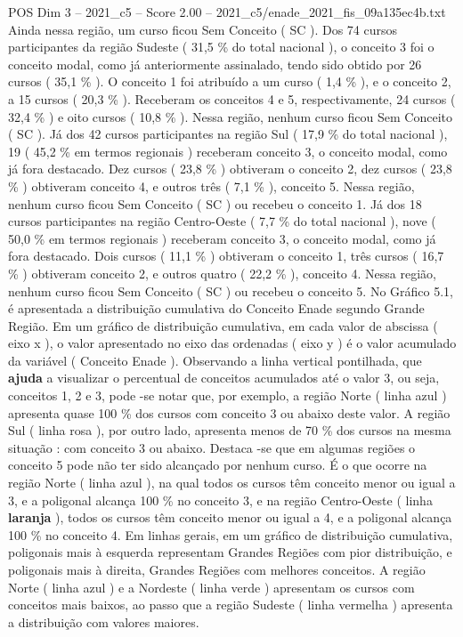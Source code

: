 \begin{textsample}{POS Dim 3 – 2021\_c5 – Score 2.00 – 2021\_c5/enade\_2021\_fis\_09a135ec4b.txt}
Ainda nessa região, um curso ficou Sem Conceito ( SC ).
Dos 74 cursos participantes da região Sudeste ( 31,5 \% do total nacional ), o conceito 3 foi o conceito modal, como já anteriormente assinalado, tendo sido obtido por 26 cursos ( 35,1 \% ).
O conceito 1 foi atribuído a um curso ( 1,4 \% ), e o conceito 2, a 15 cursos ( 20,3 \% ).
Receberam os conceitos 4 e 5, respectivamente, 24 cursos ( 32,4 \% ) e oito cursos ( 10,8 \% ).
Nessa região, nenhum curso ficou Sem Conceito ( SC ).
Já dos 42 cursos participantes na região Sul ( 17,9 \% do total nacional ), 19 ( 45,2 \% em termos regionais ) receberam conceito 3, o conceito modal, como já fora destacado.
Dez cursos ( 23,8 \% ) obtiveram o conceito 2, dez cursos ( 23,8 \% ) obtiveram conceito 4, e outros três ( 7,1 \% ), conceito 5.
Nessa região, nenhum curso ficou Sem Conceito ( SC ) ou recebeu o conceito 1.
Já dos 18 cursos participantes na região Centro-Oeste ( 7,7 \% do total nacional ), nove ( 50,0 \% em termos regionais ) receberam conceito 3, o conceito modal, como já fora destacado.
Dois cursos ( 11,1 \% ) obtiveram o conceito 1, três cursos ( 16,7 \% ) obtiveram conceito 2, e outros quatro ( 22,2 \% ), conceito 4.
Nessa região, nenhum curso ficou Sem Conceito ( SC ) ou recebeu o conceito 5.
No Gráfico 5.1, é apresentada a distribuição cumulativa do Conceito Enade segundo Grande Região.
Em um gráfico de distribuição cumulativa, em cada valor de abscissa ( eixo x ), o valor apresentado no eixo das ordenadas ( eixo y ) é o valor acumulado da variável ( Conceito Enade ).
Observando a linha vertical pontilhada, que \textbf{ajuda} a visualizar o percentual de conceitos acumulados até o valor 3, ou seja, conceitos 1, 2 e 3, pode -se notar que, por exemplo, a região Norte ( linha azul ) apresenta quase 100 \% dos cursos com conceito 3 ou abaixo deste valor.
A região Sul ( linha rosa ), por outro lado, apresenta menos de 70 \% dos cursos na mesma situação : com conceito 3 ou abaixo.
Destaca -se que em algumas regiões o conceito 5 pode não ter sido alcançado por nenhum curso.
É o que ocorre na região Norte ( linha azul ), na qual todos os cursos têm conceito menor ou igual a 3, e a poligonal alcança 100 \% no conceito 3, e na região Centro-Oeste ( linha \textbf{laranja} ), todos os cursos têm conceito menor ou igual a 4, e a poligonal alcança 100 \% no conceito 4.
Em linhas gerais, em um gráfico de distribuição cumulativa, poligonais mais à esquerda representam Grandes Regiões com pior distribuição, e poligonais mais à direita, Grandes Regiões com melhores conceitos.
A região Norte ( linha azul ) e a Nordeste ( linha verde ) apresentam os cursos com conceitos mais baixos, ao passo que a região Sudeste ( linha vermelha ) apresenta a distribuição com valores maiores.

\end{textsample}

